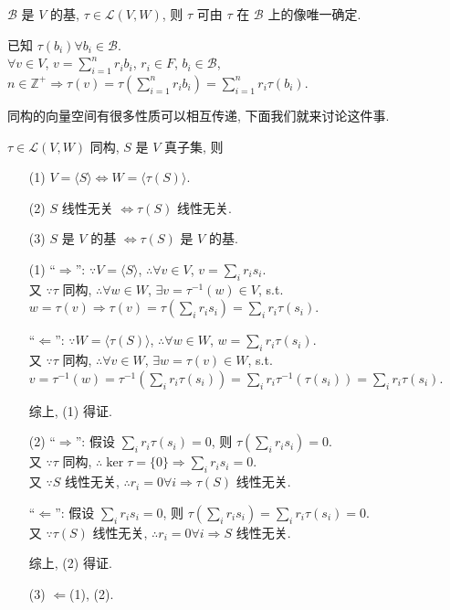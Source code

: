 \documentclass{note}
\begin{document}
\begin{thm}[(课本定理 2.2)]\label{thm-2.4}
    $\mathcal{B}$ 是 $V$ 的基, $\tau\in\mathcal{L}(V,W)$, 则 $\tau$ 可由 $\tau$ 在 $\mathcal{B}$ 上的像唯一确定.
\end{thm}
\begin{pf}
    已知 $\tau(b_i)\forall b_i\in\mathcal{B}$.\\
    $\forall v\in V$, $v=\sum_{i=1}^nr_ib_i$, $r_i\in F$, $b_i\in\mathcal{B}$, $n\in\mathbb{Z}^+\Longrightarrow\tau(v)=\tau\left(\sum_{i=1}^nr_ib_i\right)=\sum_{i=1}^nr_i\tau(b_i)$.
\end{pf}

同构的向量空间有很多性质可以相互传递, 下面我们就来讨论这件事.

\begin{thm}[(课本定理 2.4)]
    $\tau\in\mathcal{L}(V,W)$ 同构, $S$ 是 $V$ 真子集, 则
    \begin{itemize}
        \item[(1)] $V=\langle S\rangle\Longleftrightarrow W=\langle\tau(S)\rangle$.
        \item[(2)] $S$ 线性无关 $\Longleftrightarrow\tau(S)$ 线性无关.
        \item[(3)] $S$ 是 $V$ 的基 $\Longleftrightarrow\tau(S)$ 是 $V$ 的基.
    \end{itemize}
\end{thm}
\begin{pf}
    \begin{itemize}
        \item[(1)] ``$\Longrightarrow$'': $\because V=\langle S\rangle$, $\therefore\forall v\in V$, $v=\sum_ir_is_i$.\\
        又 $\because\tau$ 同构, $\therefore\forall w\in W$, $\exists v=\tau^{-1}(w)\in V$, s.t. $w=\tau(v)\Longrightarrow\tau(v)=\tau\left(\sum_ir_is_i\right)=\sum_ir_i\tau(s_i)$.

        ``$\Longleftarrow$'': $\because W=\langle\tau(S)\rangle$, $\therefore\forall w\in W$, $w=\sum_ir_i\tau(s_i)$.\\
        又 $\because\tau$ 同构, $\therefore\forall v\in W$, $\exists w=\tau(v)\in W$, s.t. $v=\tau^{-1}(w)=\tau^{-1}\left(\sum_ir_i\tau(s_i)\right)=\sum_ir_i\tau^{-1}(\tau(s_i))=\sum_ir_i\tau(s_i)$.

        综上, (1) 得证.
        \item[(2)] ``$\Longrightarrow$'': 假设 $\sum_ir_i\tau(s_i)=0$, 则 $\tau\left(\sum_ir_is_i\right)=0$.\\
        又 $\because\tau$ 同构, $\therefore\ker\tau=\{0\}\Longrightarrow\sum_ir_is_i=0$.\\
        又 $\because S$ 线性无关, $\therefore r_i=0\forall i\Longrightarrow\tau(S)$ 线性无关.

        ``$\Longleftarrow$'': 假设 $\sum_ir_is_i=0$, 则 $\tau\left(\sum_ir_is_i\right)=\sum_ir_i\tau(s_i)=0$.\\
        又 $\because\tau(S)$ 线性无关, $\therefore r_i=0\forall i\Longrightarrow S$ 线性无关.

        综上, (2) 得证.
        \item[(3)] $\Longleftarrow$(1), (2).
    \end{itemize}
\end{pf}
\end{document}
